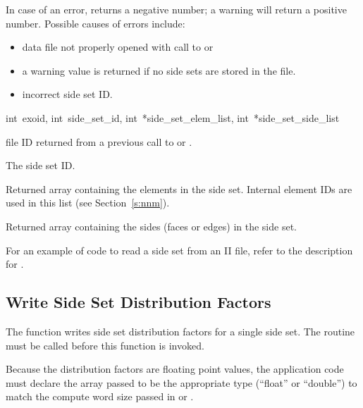 In case of an error,  returns a negative
number; a warning will return a positive number.
Possible causes of errors include:

\begin{itemize}
 \item data file not properly opened with call to 
 or 

 \item a warning value is returned if no side sets are stored
in the file.

 \item incorrect side set ID.
\end{itemize}

{int~exoid,
int~side_set_id,
int~*side_set_elem_list,
int~*side_set_side_list}

\begin{parameters}
\item[{int exoid \R{}}]
\exo{} file ID returned from a previous call to 
or .

\item[{int side_set_id \R{}}]
The side set ID.

\item[{int* side_set_elem_list \W{}}]
Returned array containing the elements in the side set. Internal
element IDs are used in this list (see  Section~\ref{s:nnm}).

\item[{int* side_set_side_list \W{}}]
Returned array containing the sides (faces or edges) in the
side set.
\end{parameters}

For an example of code to read a side set from an \exo{}
II file, refer to the description for .




\subsection{Write Side Set Distribution Factors}

The function  writes side set
distribution factors for a single side set. The routine
 must be called before this function
is invoked.


Because the distribution factors are floating point values, the
application code must declare the array passed to be the appropriate
type (``float'' or ``double'') to match the compute word size passed
in  or .

